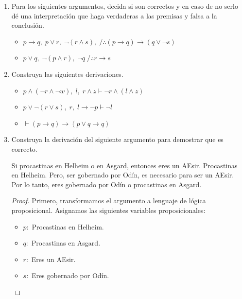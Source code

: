 \documentclass[letterpaper,11pt]{article}
\begin{document}
\begin{enumerate}
    \item Para los siguientes argumentos, decida si son correctos y en caso de 
    no serlo dé una interpretación que haga verdaderas a las premisas y falsa 
    a la conclusión.

    \begin{itemize}
        \item $p → q, \; p \lor r, \; \neg (r \land s), \; /∴ (p → q) → 
               (q \lor \neg s)$
        \item $p \lor q, \; \neg (p \land r), \; \neg q \; /∴ r → s$
    \end{itemize}

    \item Construya las siguientes derivaciones.

    \begin{itemize}
        \item $p \land (\neg r \land \neg w), \; l, \; r \land z ⊢ \neg r 
               \land (l \land z)$
        \item $p \lor \neg(r \lor s), \; r, \; l → \neg p ⊢ \neg l$
        \item $⊢(p → q) → (p \lor q → q)$
    \end{itemize}

    \item Construya la derivación del siguiente argumento para demostrar que es 
    correcto.

    Si procastinas en Helheim o en Asgard, entonces eres un AEsir. Procastinas 
    en Helheim. Pero, ser gobernado por Odín, es necesario para ser un AEsir. 
    Por lo tanto, eres gobernado por Odín o procastinas en Asgard.

    \begin{proof}
        Primero, transformamos el argumento a lenguaje de lógica proposicional.
        Asignamos las siguientes variables proposicionales:

        \begin{itemize}
            \item $p:$ Procastinas en Helheim.
            \item $q:$ Procastinas en Asgard.
            \item $r:$ Eres un AEsir.
            \item $s:$ Eres gobernado por Odín.
        \end{itemize}


\end{proof}
\end{enumerate}
\end{document}
